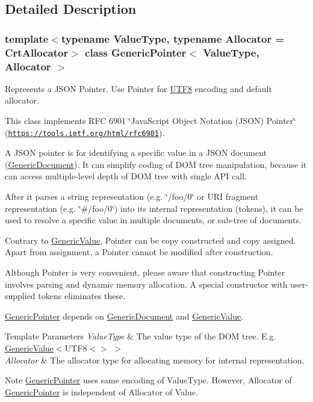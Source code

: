 \subsection{Detailed Description}
\subsubsection*{template$<$typename Value\+Type, typename Allocator = Crt\+Allocator$>$\newline
class Generic\+Pointer$<$ Value\+Type, Allocator $>$}

Represents a J\+S\+ON Pointer. Use Pointer for \hyperlink{structUTF8}{U\+T\+F8} encoding and default allocator. 

This class implements R\+FC 6901 \char`\"{}\+Java\+Script Object Notation (\+J\+S\+O\+N) Pointer\char`\"{} (\href{https://tools.ietf.org/html/rfc6901}{\tt https\+://tools.\+ietf.\+org/html/rfc6901}).

A J\+S\+ON pointer is for identifying a specific value in a J\+S\+ON document (\hyperlink{classGenericDocument}{Generic\+Document}). It can simplify coding of D\+OM tree manipulation, because it can access multiple-\/level depth of D\+OM tree with single A\+PI call.

After it parses a string representation (e.\+g. \char`\"{}/foo/0\char`\"{} or U\+RI fragment representation (e.\+g. \char`\"{}\#/foo/0\char`\"{}) into its internal representation (tokens), it can be used to resolve a specific value in multiple documents, or sub-\/tree of documents.

Contrary to \hyperlink{classGenericValue}{Generic\+Value}, Pointer can be copy constructed and copy assigned. Apart from assignment, a Pointer cannot be modified after construction.

Although Pointer is very convenient, please aware that constructing Pointer involves parsing and dynamic memory allocation. A special constructor with user-\/ supplied tokens eliminates these.

\hyperlink{classGenericPointer}{Generic\+Pointer} depends on \hyperlink{classGenericDocument}{Generic\+Document} and \hyperlink{classGenericValue}{Generic\+Value}.


\begin{DoxyTemplParams}{Template Parameters}
{\em Value\+Type} & The value type of the D\+OM tree. E.\+g. \hyperlink{classGenericValue}{Generic\+Value}$<$U\+T\+F8$<$$>$ $>$ \\
\hline
{\em Allocator} & The allocator type for allocating memory for internal representation.\\
\hline
\end{DoxyTemplParams}
\begin{DoxyNote}{Note}
\hyperlink{classGenericPointer}{Generic\+Pointer} uses same encoding of Value\+Type. However, Allocator of \hyperlink{classGenericPointer}{Generic\+Pointer} is independent of Allocator of Value. 
\end{DoxyNote}


